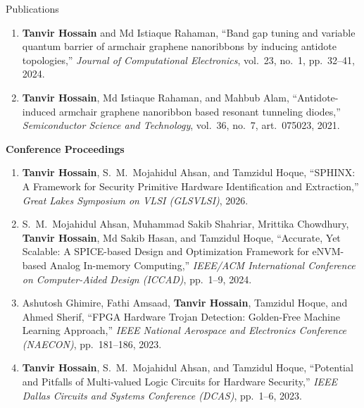 \begin{rSection}{Publications}
\begin{enumerate}[itemsep=-0.1em, leftmargin=1.5em]
    \item \textbf{Tanvir Hossain} and Md Istiaque Rahaman, ``Band gap tuning and variable quantum barrier of armchair graphene nanoribbons by inducing antidote topologies,'' \emph{Journal of Computational Electronics}, vol.\ 23, no.\ 1, pp.\ 32--41, 2024. 

    \item \textbf{Tanvir Hossain}, Md Istiaque Rahaman, and Mahbub Alam, ``Antidote-induced armchair graphene nanoribbon based resonant tunneling diodes,'' \emph{Semiconductor Science and Technology}, vol.\ 36, no.\ 7, art.\ 075023, 2021. 
\end{enumerate}

\vspace{-0.1cm}
\textbf{Conference Proceedings}
\vspace{-0.15cm}

\begin{enumerate}[label=\arabic*., itemsep=-0.1em, leftmargin=1.5em]
    \item \textbf{Tanvir Hossain}, S.\ M.\ Mojahidul Ahsan, and Tamzidul Hoque, ``SPHINX: A Framework for Security Primitive Hardware Identification and Extraction,'' \emph{Great Lakes Symposium on VLSI (GLSVLSI)}, 2026. 

    \item S.\ M.\ Mojahidul Ahsan, Muhammad Sakib Shahriar, Mrittika Chowdhury, \textbf{Tanvir Hossain}, Md Sakib Hasan, and Tamzidul Hoque, ``Accurate, Yet Scalable: A SPICE-based Design and Optimization Framework for eNVM-based Analog In-memory Computing,'' \emph{IEEE/ACM International Conference on Computer-Aided Design (ICCAD)}, pp.\ 1--9, 2024. 

    \item Ashutosh Ghimire, Fathi Amsaad, \textbf{Tanvir Hossain}, Tamzidul Hoque, and Ahmed Sherif, ``FPGA Hardware Trojan Detection: Golden-Free Machine Learning Approach,'' \emph{IEEE National Aerospace and Electronics Conference (NAECON)}, pp.\ 181--186, 2023. 

    \item \textbf{Tanvir Hossain}, S.\ M.\ Mojahidul Ahsan, and Tamzidul Hoque, ``Potential and Pitfalls of Multi-valued Logic Circuits for Hardware Security,'' \emph{IEEE Dallas Circuits and Systems Conference (DCAS)}, pp.\ 1--6, 2023. 


\end{enumerate}
\end{rSection}
